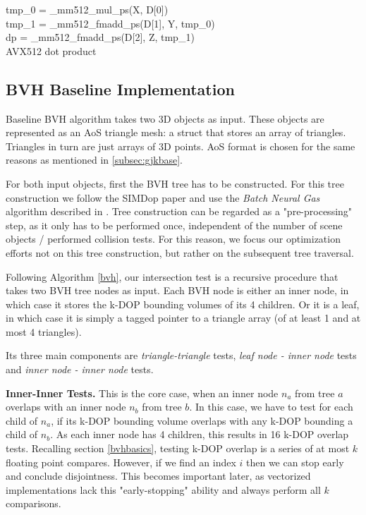\documentclass[twocolumn]{article}
\newcommand{\mypar}[1]{{\bf #1.}}
\begin{document}
\begin{algorithm}
\DontPrintSemicolon
 tmp\_0 = \_mm512\_mul\_ps(X, D[0]) \\
 tmp\_1 = \_mm512\_fmadd\_ps(D[1], Y, tmp\_0) \\
 dp = \_mm512\_fmadd\_ps(D[2], Z, tmp\_1) \\
\caption{AVX512 dot product}
\label{dot product}
\end{algorithm}

\subsection{BVH Baseline Implementation}
Baseline BVH algorithm takes two $3$D objects as input.
These objects are represented as an AoS triangle mesh: a struct that stores an array of triangles.
Triangles in turn are just arrays of $3$D points.
AoS format is chosen for the same reasons as mentioned in \ref{subsec:gjkbase}.

For both input objects, first the BVH tree has to be constructed.
For this tree construction we follow the SIMDop paper \cite{simdop} and use the \textit{Batch Neural Gas} algorithm described in \cite{neural}.
Tree construction can be regarded as a "pre-processing" step, as it only has to be performed once, independent of the number of scene objects / performed collision tests.
For this reason, we focus our optimization efforts not on this tree construction, but rather on the subsequent tree traversal.

Following Algorithm \ref{bvh}, our intersection test is a recursive procedure that takes two BVH tree nodes as input. 
Each BVH node is either an inner node, in which case it stores the k-DOP bounding volumes of its 4 children. 
Or it is a leaf, in which case it is simply a tagged pointer to a triangle array (of at least 1 and at most 4 triangles).

Its three main components are \textit{triangle-triangle} tests, \textit{leaf node  - inner node} tests and \textit{inner node - inner node} tests.

\mypar{Inner-Inner Tests} This is the core case, when an inner node $n_a$ from tree $a$ overlaps with an inner node $n_b$ from tree $b$.
In this case, we have to test for each child of $n_a$, if its k-DOP bounding volume overlaps with any k-DOP bounding a child of $n_b$.
As each inner node has 4 children, this results in 16 k-DOP overlap tests.
Recalling section \ref{bvhbasics}, testing k-DOP overlap is a series of at most $k$ floating point compares.
However, if we find an index $i$ then we can stop early and conclude disjointness. 
This becomes important later, as vectorized implementations lack this "early-stopping" ability and always perform all $k$ comparisons.
\end{document}
